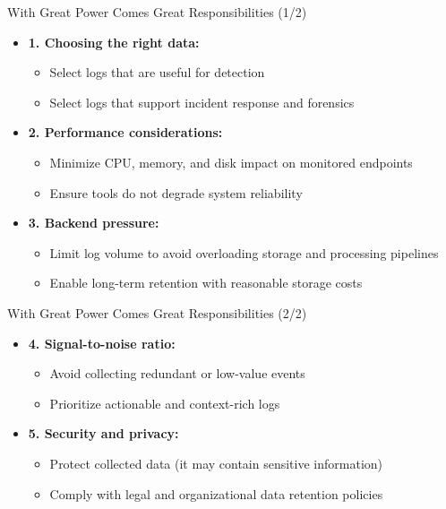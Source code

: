 \documentclass[12pt,aspectratio=169, colorlinks=true, linkcolor=circlBlue]{beamer}
\begin{document}
\begin{frame}{With Great Power Comes Great Responsibilities (1/2)}
	\begin{itemize}
		\item \textbf{1. Choosing the right data:}
		      \begin{itemize}
			      \item Select logs that are useful for detection
			      \item Select logs that support incident response and forensics
		      \end{itemize}
		\item \textbf{2. Performance considerations:}
		      \begin{itemize}
			      \item Minimize CPU, memory, and disk impact on monitored endpoints
			      \item Ensure tools do not degrade system reliability
		      \end{itemize}
		\item \textbf{3. Backend pressure:}
		      \begin{itemize}
			      \item Limit log volume to avoid overloading storage and processing pipelines
			      \item Enable long-term retention with reasonable storage costs
		      \end{itemize}
	\end{itemize}
\end{frame}

\begin{frame}{With Great Power Comes Great Responsibilities (2/2)}
	\begin{itemize}
		\item \textbf{4. Signal-to-noise ratio:}
		      \begin{itemize}
			      \item Avoid collecting redundant or low-value events
			      \item Prioritize actionable and context-rich logs
		      \end{itemize}
		\item \textbf{5. Security and privacy:}
		      \begin{itemize}
			      \item Protect collected data (it may contain sensitive information)
			      \item Comply with legal and organizational data retention policies
		      \end{itemize}
	\end{itemize}



\end{frame}
\end{document}
